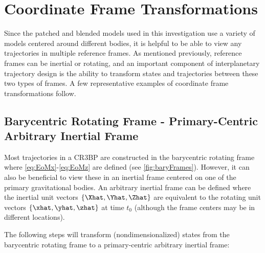 \section{Coordinate Frame Transformations}
Since the patched and blended models used in this investigation use a variety of models centered
around different bodies, it is helpful to be able to view any trajectories in multiple reference
frames. As mentioned previously, reference frames can be inertial or rotating, and an important
component of interplanetary trajectory design is the ability to transform states and trajectories
between these two types of frames. A few representative examples of coordinate frame
transformations follow.

\subsection{Barycentric Rotating Frame - Primary-Centric Arbitrary Inertial Frame}
Most trajectories in a CR3BP are constructed in the barycentric rotating frame where
\cref{eq:EoMx}-\cref{eq:EoMz} are defined (see \cref{fig:baryFrames}). However, it can also be
beneficial to view these in an inertial frame centered on one of the primary gravitational bodies.
An arbitrary inertial frame can be defined where the inertial unit vectors $\{\Xhat,\Yhat,\Zhat\}$
are equivalent to the rotating unit vectors $\{\xhat,\yhat,\zhat\}$ at time $t_{0}$ (although the
frame centers may be in different locations).

The following steps will transform (nondimensionalized) states from the barycentric rotating frame
to a primary-centric arbitrary inertial frame:

